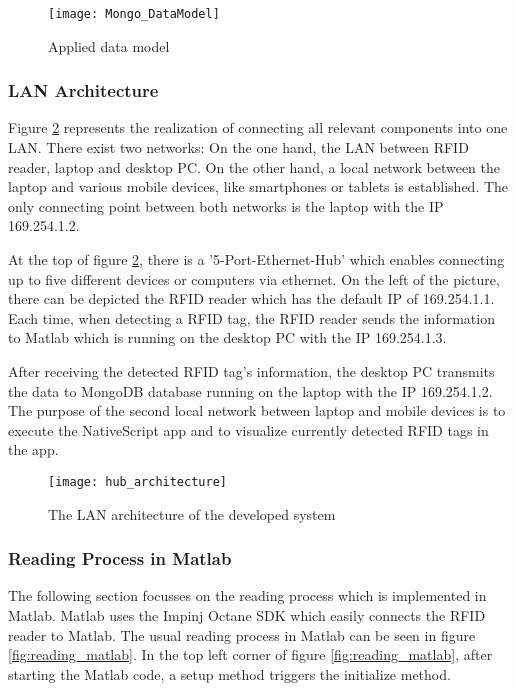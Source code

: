 \begin{figure}
\centering
\texttt{[image: Mongo\_DataModel]} 
\caption{\label{fig:datamodel}Applied data model} 
\end{figure}

\subsubsection{\ac{LAN} Architecture}

Figure \ref{fig:hub_architecture} represents the realization of connecting all relevant components into one LAN. There exist two networks: On the one hand, the LAN between RFID reader, laptop and desktop PC. On the other hand, a local network between the laptop and various mobile devices, like smartphones or tablets is established. The only connecting point between both networks is the laptop with the IP 169.254.1.2.

At the top of figure \ref{fig:hub_architecture}, there is a '5-Port-Ethernet-Hub' which enables connecting up to five different devices or computers via ethernet. 
On the left of the picture, there can be depicted the RFID reader which has the default IP of 169.254.1.1. Each time, when detecting a RFID tag, the RFID reader sends the information to Matlab which is running on the desktop PC with the IP 169.254.1.3. 

After receiving the detected RFID tag's information, the desktop PC transmits the data to MongoDB database running on the laptop with the IP 169.254.1.2. 
The purpose of the second local network between laptop and mobile devices is to execute the NativeScript app and to visualize currently detected RFID tags in the app.

\begin{figure}
\centering
\texttt{[image: hub\_architecture]} 
\caption{\label{fig:hub_architecture}The LAN architecture of the developed system} 
\end{figure}

\subsubsection{Reading Process in Matlab}

The following section focusses on the reading process which is implemented in Matlab. Matlab uses the Impinj Octane SDK \cite{octanesdk} which easily connects the RFID reader to Matlab. The usual reading process in Matlab can be seen in figure \ref{fig:reading_matlab}. In the top left corner of figure \ref{fig:reading_matlab}, after starting the Matlab code, a setup method triggers the initialize method. 

